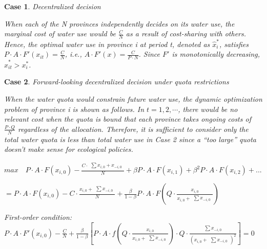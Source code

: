 \documentclass[default, sn-standardnature]{sn-jnl} %
\newtheorem{case_appendix}{Case}
\begin{document}
 \begin{case_appendix}Decentralized decision

When each of the N provinces independently decides on its water use, the marginal cost of water use would be $\frac{C}{N}$ as a result of cost-sharing with others.
Hence, the optimal water use in province i at period t, denoted as $\hat x_i^*$, satisfies $P \cdot A \cdot F'(x_{it})=\frac{C}{N}$, i.e., $A \cdot F'(x)=\frac{C}{P \cdot N}$.
Since $F'$ is monotonically decreasing, $\hat x_{it}^*>x_i^*$.
\end{case_appendix}


 \begin{case_appendix}Forward-looking decentralized decision under quota restrictions

 When the water quota would constrain future water use, the dynamic optimization problem of province i is shown as follows. In $t=1,2,\cdots$, there would be no relevant cost when the quota is bound that each province takes ongoing costs of $\frac{P \cdot Q}{N}$ regardless of the allocation. Therefore, it is sufficient to consider only the total water quota is less than total water use in Case 2 since a ``too large'' quota doesn't make sense for ecological policies.

$max  \quad P \cdot A \cdot F(x_{i,0})-\frac{C \cdot \begin{matrix} \sum x_{i,0} + x_{-i,0} \end{matrix}}{N}+\beta P \cdot A \cdot F(x_{i,1})+\beta^2 P \cdot A \cdot F(x_{i,2})+...$

$=P \cdot A \cdot F(x_{i,0})-C \cdot \frac{x_{i,0} + \begin{matrix} \sum x_{-i,0} \end{matrix}}{N}+\frac{\beta}{1-\beta} P \cdot A \cdot F(Q \cdot \frac{x_{i,0}}{x_{i,0} + \begin{matrix} \sum x_{-i,0} \end{matrix}})$

First-order condition: $P \cdot A \cdot F'(x_{i,0})-\frac{C}{N}+\frac{\beta}{1-\beta}[P \cdot A \cdot f(Q \cdot \frac{x_{i,0}}{x_{i,0} + \begin{matrix} \sum x_{-i,0} \end{matrix}}) \cdot Q \cdot \frac{\begin{matrix} \sum x_{-i,0} \end{matrix}}{(x_{i,0}+\begin{matrix} \sum  x_{-i,0} \end{matrix})^2}]=0$


\end{case_appendix}
\end{document}
